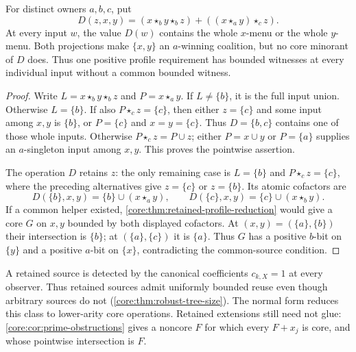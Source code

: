 \begin{proposition}
\label{core:prop:positive-profile-gluing}
For distinct owners $a,b,c$, put
\[
 D(z,x,y)=(x\star_b y\star_b z)+((x\star_a y)\star_c z).
\]
At every input $w$, the value $D(w)$ contains the whole $x$-menu or
the whole $y$-menu. Both projections make $\{x,y\}$ an $a$-winning
coalition, but no core minorant of $D$ does. Thus one positive profile
requirement has bounded witnesses at every individual input without
a common bounded witness.
\end{proposition}
\begin{proof}
Write $L=x\star_b y\star_b z$ and $P=x\star_a y$.
If $L\ne\{b\}$, it is the full input union. Otherwise $L=\{b\}$.
If also $P\star_c z=\{c\}$, then either $z=\{c\}$ and some
input among $x,y$ is $\{b\}$, or $P=\{c\}$ and $x=y=\{c\}$.
Thus $D=\{b,c\}$ contains one of those whole inputs. Otherwise
$P\star_c z=P\cup z$; either $P=x\cup y$ or $P=\{a\}$ supplies
an $a$-singleton input among $x,y$. This proves the pointwise assertion.

The operation $D$ retains $z$: the only remaining case is
$L=\{b\}$ and $P\star_c z=\{c\}$, where the preceding alternatives
give $z=\{c\}$ or $z=\{b\}$.
Its atomic cofactors are
\[
 D(\{b\},x,y)=\{b\}\cup(x\star_a y),\qquad
 D(\{c\},x,y)=\{c\}\cup(x\star_b y).
\]
If a common helper existed, \cref{core:thm:retained-profile-reduction}
would give a core $G$ on $x,y$ bounded by both displayed cofactors.
At $(x,y)=(\{a\},\{b\})$ their intersection is $\{b\}$;
at $(\{a\},\{c\})$ it is $\{a\}$.
Thus $G$ has a positive $b$-bit on $\{y\}$ and a positive $a$-bit
on $\{x\}$, contradicting the common-source condition.
\end{proof}

A retained source is detected by the canonical coefficients
$c_{k,X}=1$ at every observer. Thus retained sources admit uniformly
bounded reuse even though arbitrary
sources do not (\cref{core:thm:robust-tree-size}). The normal form reduces
this class to lower-arity core operations. Retained extensions still need
not glue: \cref{core:cor:prime-obstructions} gives a noncore $F$ for which
every $F+x_j$ is core, and whose pointwise intersection is $F$.
